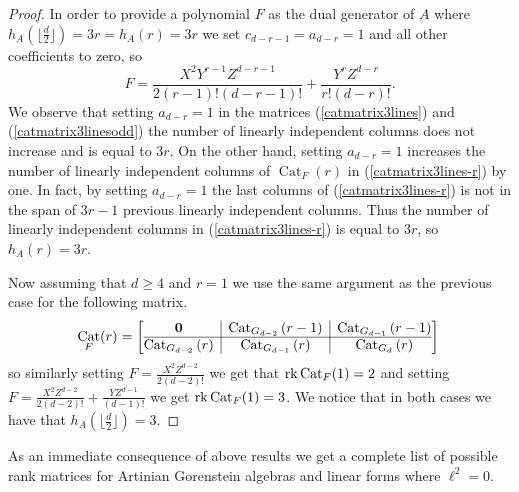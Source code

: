 \documentclass[12pt]{amsart}
\numberwithin{equation}{section}
\theoremstyle{plain} \newtheorem{theorem}{Theorem}[section]
\theoremstyle{definition} \newtheorem{definition}[theorem]{Definition}
\DeclareMathOperator{\Cat}{Cat}\DeclareMathOperator{\B}{\mathcal{B}}
\begin{document}
\begin{proof}
In order to provide a polynomial $F$ as the dual generator of $A$ where $h_A(\lfloor\frac{d}{2}\rfloor)=3r=h_A(r)=3r$ we set $c_{d-r-1}=a_{d-r}=1$ and all other coefficients to zero, so
\begin{equation}\label{3rFeven}
F = \frac{X^2 Y^{r-1}Z^{d-r-1}}{2(r-1)!(d-r-1)!} + \frac{Y^rZ^{d-r}}{r!(d-r)!}.
\end{equation}
We observe that setting $a_{d-r}=1$ in the matrices (\ref{catmatrix3lines}) and  (\ref{catmatrix3linesodd}) the number of linearly independent columns does not increase and is equal to $3r$. On the other hand, setting $a_{d-r}=1$ increases the number of linearly independent columns of $\Cat_F(r)$ in (\ref{catmatrix3lines-r}) by one. In fact, by setting $a_{d-r}=1$ the last columns of (\ref{catmatrix3lines-r}) is not in the span of $3r-1$ previous linearly independent columns. Thus the number of linearly independent columns in (\ref{catmatrix3lines-r}) is equal to $3r$,  so $h_A(r)=3r$.

\noindent Now assuming that $d\geq 4$ and  $r=1$ we use the same argument as the previous case for the following matrix. 
\begin{equation}\label{catmatrix3lines(r=1)}
\Cat_F(r)=\left[\begin{array}{@{}c|c|c@{}}
 \mathbf{0}&{\Cat_{G_{d-2}}{(r-1)}}&{\Cat_{G_{d-1}}{(r-1)}}
\\\hline
\Cat_{G_{d-2}}{(r)}&\Cat_{G_{d-1}}{(r)}&\Cat_{G_{d}}{(r)}\\
\end{array}
\right]\\
\end{equation}
so similarly setting $F = \frac{X^2 Z^{d-2}}{2(d-2)!}$  we get that $\rk\Cat_F(1)=2$ and  setting $F = \frac{X^2 Z^{d-2}}{2(d-2)!} + \frac{Y Z^{d-1}}{(d-1)!}$ we get $\rk\Cat_F(1)=3$. We notice that in both cases we have that $h_A(\lfloor\frac{d}{2}\rfloor)=3$.

\end{proof}
As an immediate consequence of above results we get a complete list of possible rank matrices for Artinian Gorenstein algebras and linear forms where $\ell^2=0$.
\end{document}
